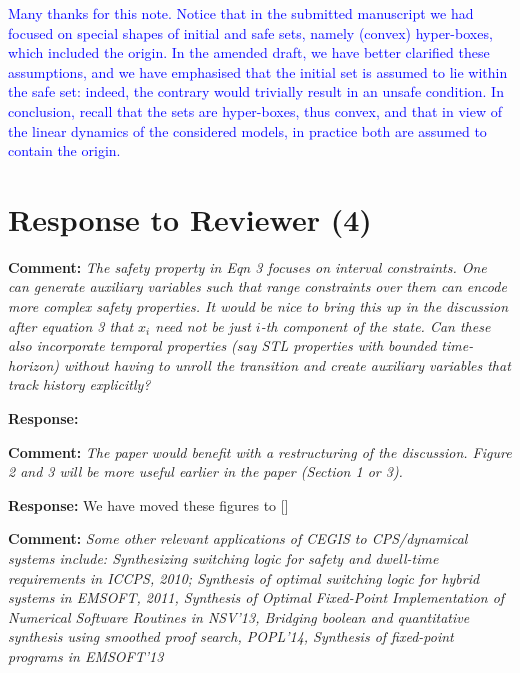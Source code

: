 \documentclass{article}
\newcommand{\rev}[1]{\textcolor{blue}{#1}}
\begin{document}
\rev{
Many thanks for this note. 
Notice that in the submitted manuscript we had focused on special shapes of initial and safe sets, namely (convex) hyper-boxes, which included the origin. 
In the amended draft, we have better clarified these assumptions, and 
we have emphasised that the initial set is assumed to lie within the safe set: indeed, the contrary would trivially result in an unsafe condition. 
In conclusion, recall that the sets are hyper-boxes, thus convex, and that in view of the linear dynamics of the considered models, in practice both are assumed to contain the origin.  }

\section{Response to Reviewer (4)}

{\bf Comment:  } {\itshape The safety property in Eqn 3 focuses on interval constraints. One can generate auxiliary variables such that range constraints over them can encode
more complex safety properties. It would be nice to bring this up in the discussion after equation 3 that $x_i$ need not be just $i$-th component of the
state.  Can these also incorporate temporal properties (say STL properties with bounded time-horizon) without having to unroll the transition and
create auxiliary variables that track history explicitly?}

\vspace{1em}
{\bf Response: }


\vspace{2em}
{\bf Comment: } {\itshape The paper would benefit with a restructuring of the discussion. Figure 2 and 3 will be more useful
earlier in the paper (Section 1 or 3).}

\vspace{1em}
{\bf Response: }
We have moved these figures to [] 
\vspace{2em}

{\bf Comment: } {\itshape
Some other relevant applications of CEGIS to CPS/dynamical systems include: Synthesizing switching logic for
safety and dwell-time requirements in ICCPS, 2010; Synthesis of optimal switching logic for hybrid systems in EMSOFT, 2011, Synthesis of Optimal
Fixed-Point Implementation of Numerical Software Routines in NSV'13, Bridging boolean and quantitative synthesis using smoothed proof search,
POPL'14, Synthesis of fixed-point programs in EMSOFT'13}
\end{document}
